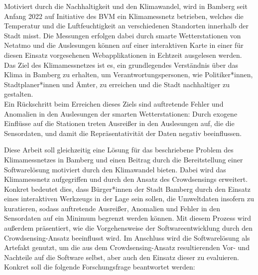 Motiviert durch die Nachhaltigkeit und den Klimawandel, wird in Bamberg seit Anfang 2022 auf Initiative des \ac{BVM} ein Klimamessnetz betrieben, welches die Temperatur und die Luftfeuchtigkeit an verschiedenen Standorten innerhalb der Stadt misst. Die Messungen erfolgen dabei durch smarte Wetterstationen von Netatmo und die Auslesungen können auf einer interaktiven Karte in einer für diesen Einsatz vorgesehenen Webapplikationen in Echtzeit ausgelesen werden. Das Ziel des Klimamessnetzes ist es, ein grundlegendes Verständnis über das Klima in Bamberg zu erhalten, um Verantwortungspersonen, wie Politiker*innen, Stadtplaner*innen und Ämter, zu erreichen und die Stadt nachhaltiger zu gestalten. \\ Ein Rückschritt beim Erreichen dieses Ziels sind auftretende Fehler und Anomalien in den Auslesungen der smarten Wetterstationen: Durch exogene Einflüsse auf die Stationen treten Ausreißer in den Auslesungen auf, die die Sensordaten, und damit die Repräsentativität der Daten negativ beeinflussen. 

Diese Arbeit soll gleichzeitig eine Lösung für das beschriebene Problem des Klimamessnetzes in Bamberg und einen Beitrag durch die Bereitstellung einer Softwarelösung motiviert durch den Klimawandel bieten. Dabei wird das Klimamessnetz aufgegriffen und durch den Ansatz des Crowdsensings erweitert. Konkret bedeutet dies, dass Bürger*innen der Stadt Bamberg durch den Einsatz eines interaktiven Werkzeugs in der Lage sein sollen, die Umweltdaten insofern zu kuratieren, sodass auftretende Ausreißer, Anomalien und Fehler in den Sensordaten auf ein Minimum begrenzt werden können. Mit diesem Prozess wird außerdem präsentiert, wie die Vorgehensweise der Softwareentwicklung durch den Crowdsensing-Ansatz beeinflusst wird. Im Anschluss wird die Softwarelösung als Artefakt genutzt, um die aus dem Crowdsensing-Ansatz resultierenden Vor- und Nachteile auf die Software selbst, aber auch den Einsatz dieser zu evaluieren. Konkret soll die folgende Forschungsfrage beantwortet werden: 

